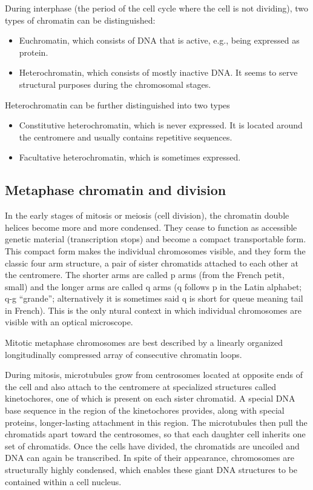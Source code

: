 During interphase (the period of the cell cycle where the cell is not dividing), two types of chromatin can be distinguished:

\begin{itemize}
\tightlist
\item
  Euchromatin, which consists of DNA that is active, e.g., being expressed as protein.
\item
  Heterochromatin, which consists of mostly inactive DNA. It seems to serve structural purposes during the chromosomal stages.
\end{itemize}

Heterochromatin can be further distinguished into two types

\begin{itemize}
\tightlist
\item
  Constitutive heterochromatin, which is never expressed. It is located around the centromere and usually contains repetitive sequences.
\item
  Facultative heterochromatin, which is sometimes expressed.
\end{itemize}

\hypertarget{metaphase-chromatin-and-division}{%
\subsection{Metaphase chromatin and division}\label{metaphase-chromatin-and-division}}

In the early stages of mitosis or meiosis (cell division), the chromatin double helices become more and more condensed. They cease to function as accessible genetic material (transcription stops) and become a compact transportable form. This compact form makes the individual chromosomes visible, and they form the classic four arm structure, a pair of sister chromatids attached to each other at the centromere. The shorter arms are called p arms (from the French petit, small) and the longer arms are called q arms (q follows p in the Latin alphabet; q-g ``grande''; alternatively it is sometimes said q is short for queue meaning tail in French). This is the only ntural context in which individual chromosomes are visible with an optical microscope.

Mitotic metaphase chromosomes are best described by a linearly organized longitudinally compressed array of consecutive chromatin loops.

During mitosis, microtubules grow from centrosomes located at opposite ends of the cell and also attach to the centromere at specialized structures called kinetochores, one of which is present on each sister chromatid. A special DNA base sequence in the region of the kinetochores provides, along with special proteins, longer-lasting attachment in this region. The microtubules then pull the chromatids apart toward the centrosomes, so that each daughter cell inherits one set of chromatids. Once the cells have divided, the chromatids are uncoiled and DNA can again be transcribed. In spite of their appearance, chromosomes are structurally highly condensed, which enables these giant DNA structures to be contained within a cell nucleus.

